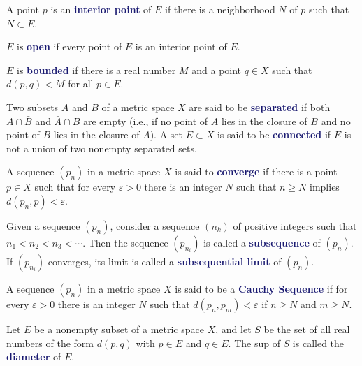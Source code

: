 \documentclass[11pt]{article}
\numberwithin{equation}{section}
\newcommand{\navy}[1]{\textcolor{MidnightBlue}{\bf #1}}
\theoremstyle{definition}
\theoremstyle{definition}
\newcommand{\1}{\mathbbm 1}
\newcommand{\e}{\varepsilon}
\begin{document}
\begin{definition}[Interior]
A point $p$ is an \navy{interior point} of $E$ if there is a neighborhood $N$ of $p$ such that $N \subset E$.
\end{definition}

\begin{definition}[Open]
$E$ is \navy{open} if every point of $E$ is an interior point of $E$.
\end{definition}

\begin{definition}[Bounded]
$E$ is \navy{bounded} if there is a real number $M$ and a point $q \in X$ such that $d(p,q) < M$ for all $p \in E$.
\end{definition}

\begin{definition}
Two subsets $A$ and $B$ of a metric space $X$ are said to be \navy{separated} if both $A \cap \bar{B}$ and $\bar{A} \cap B$ are empty (i.e., if no point of $A$ lies in the closure of $B$ and no point of $B$ lies in the closure of $A$). A set $E \subset X$ is said to be \navy{connected} if $E$ is not a union of two nonempty separated sets.
\end{definition}

\begin{definition}
A sequence $(p_n)$ in a metric space $X$ is said to \navy{converge} if there is a point $p \in X$ such that for every $\e > 0$ there is an integer $N$ such that $n \geq N$ implies $d(p_n,p) < \e$.
\end{definition}

\begin{definition}
Given a sequence $(p_n)$, consider a sequence $(n_k)$ of positive integers such that $n_1 < n_2 < n_3 < \cdots $. Then the sequence $(p_{n_i})$ is called a \navy{subsequence} of $(p_n)$. If $(p_{n_i})$ converges, its limit is called a \navy{subsequential limit} of $(p_n)$.
\end{definition}

\begin{definition}
A sequence $(p_n)$ in a metric space $X$ is said to be a \navy{Cauchy Sequence} if for every $\e > 0$ there is an integer $N$ such that $d(p_n, p_m) < \e$ if $n \geq N$ and $m \geq N$.
\end{definition}

\begin{definition}[Diameter]
Let $E$ be a nonempty subset of a metric space $X$, and let $S$ be the set of all real numbers of the form $d(p,q)$ with $p \in E$ and $q \in E$. The sup of $S$ is called the \navy{diameter} of $E$.
\end{definition}
\end{document}
